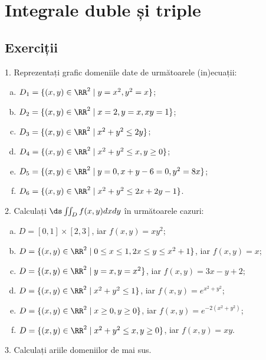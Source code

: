 \chapter{Integrale duble și triple}
\section{Exerciții}

1. Reprezentați grafic domeniile date de următoarele (in)ecuații:
\begin{enumerate}[(a)]
\item $ D_1 = \{ (x, y) \in \RR^2 \mid y = x^2, y^2 = x \} $;
\item $ D_2 = \{ (x, y) \in \RR^2 \mid x = 2, y = x, xy = 1 \} $;
\item $ D_3 = \{ (x, y) \in \RR^2 \mid x^2 + y^2 \leq 2y \} $;
\item $ D_4 = \{ (x, y) \in \RR^2 \mid x^2 + y^2 \leq x, y \geq 0 \} $;
\item $ D_5 = \{ (x, y) \in \RR^2 \mid y = 0, x + y - 6 = 0, y^2 = 8x \} $;
\item $ D_6 = \{ (x, y) \in \RR^2 \mid x^2 + y^2 \leq 2x + 2y - 1 \} $.
\end{enumerate}

\vspace{1cm}

2. Calculați $ \ds\iint_D f(x, y) dx dy $ în următoarele cazuri:
\begin{enumerate}[(a)]
\item $ D = [0, 1] \times [2, 3] $, iar $ f(x, y) = xy^2 $;
\item $ D = \{(x, y) \in \RR^2 \mid 0 \leq x \leq 1, 2x \leq y \leq x^2 + 1 \} $,
  iar $ f(x, y) = x $;
\item $ D = \{(x, y) \in \RR^2 \mid y = x, y = x^2 \} $, iar
  $ f(x, y) = 3x - y + 2 $;
\item $ D = \{(x, y) \in \RR^2 \mid x^2 + y^2 \leq 1 \} $,
  iar $ f(x, y) = e^{x^2 + y^2} $;
\item $ D = \{(x, y) \in \RR^2 \mid x \geq 0, y \geq 0 \} $,
  iar $ f(x, y) = e^{-2(x^2 + y^2)} $;
\item $ D = \{(x, y) \in \RR^2 \mid x^2 + y^2 \leq x, y \geq 0 \} $,
  iar $ f(x, y) = xy $.
\end{enumerate}

\vspace{1cm}

3. Calculați ariile domeniilor de mai sus.

